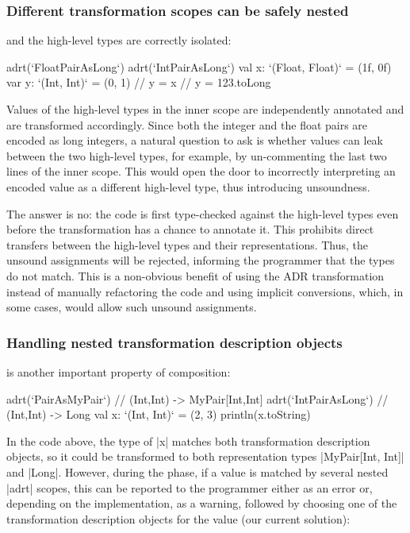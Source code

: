 \vspace{0.65em}

\subsubsection{Different transformation scopes can be safely nested} and the high-level types are correctly isolated:

\begin{lstlisting-nobreak}
adrt(`FloatPairAsLong`) {
  adrt(`IntPairAsLong`) {
    val x: `(Float, Float)` = (1f, 0f)
    var y: `(Int, Int)` = (0, 1)
    // y = x
    // y = 123.toLong
  }
}
\end{lstlisting-nobreak}

Values of the high-level types in the inner scope are independently annotated and are transformed accordingly. Since both the integer and the float pairs are encoded as long integers, a natural question to ask is whether values can leak between the two high-level types, for example, by un-commenting the last two lines of the inner scope. This would open the door to incorrectly interpreting an encoded value as a different high-level type, thus introducing unsoundness.

The answer is no: the code is first type-checked against the high-level types even before the \inject{} transformation has a chance to annotate it. This prohibits direct transfers between the high-level types and their representations. Thus, the unsound assignments will be rejected, informing the programmer that the types do not match. This is a non-obvious benefit of using the ADR transformation instead of manually refactoring the code and using implicit conversions, which, in some cases, would allow such unsound assignments.

\vspace{-0.3em}

\subsubsection{Handling nested transformation description objects} is another important property of composition:

\begin{lstlisting-nobreak}
adrt(`PairAsMyPair`) {            // (Int,Int) -> MyPair[Int,Int]
  adrt(`IntPairAsLong`) { // (Int,Int) -> Long
    val x: `(Int, Int)` = (2, 3)
  }
  println(x.toString)
}
\end{lstlisting-nobreak}

In the code above, the type of |x| matches both transformation description objects, so it could be transformed to both representation types |MyPair[Int, Int]| and |Long|. However, during the \inject{} phase, if a value is matched by several nested |adrt| scopes, this can be reported to the programmer either as an error or, depending on the implementation, as a warning, followed by choosing one of the transformation description objects for the value (our current solution):

